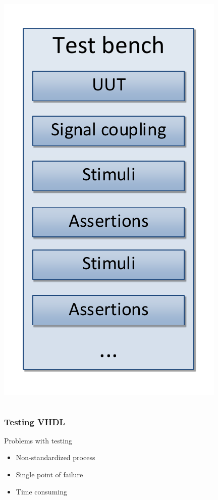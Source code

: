 \documentclass[british,10pt]{beamer}
\begin{document}
\begin{frame}
\begin{columns}
\includegraphics[width=\textwidth]{images/TB.pdf}
\end{columns}
\end{frame}

\begin{frame}\frametitle{Testing VHDL}
Problems with testing
\begin{itemize}
\item Non-standardized process
\item Single point of failure
\item Time consuming
\end{itemize}
\end{frame}
\end{document}

